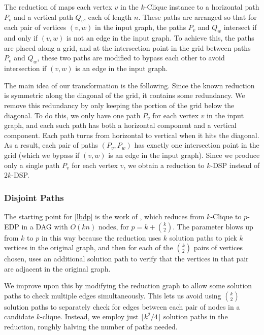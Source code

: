 \documentclass[11pt]{article}
\theoremstyle{definition}
\begin{document}
The reduction of \cite{Geometric-Lens} maps each vertex $v$ in the \textsf{$k$-Clique} instance to a horizontal path $P_v$ and a vertical path $Q_v$, each of length $n$. These paths are arranged so that for each pair of vertices $(v,w)$ in the input graph, the paths $P_v$ and $Q_w$ intersect if and only if $(v,w)$ is not an edge in the input graph. To achieve this, the paths are placed along a grid, and at the intersection point in the grid between paths $P_v$ and $Q_w$, these two paths are modified to bypass each other to avoid intersection if $(v,w)$ is an edge in the input graph.

The main idea of our transformation is the following. Since the known reduction is symmetric along the diagonal of the grid, it contains some redundancy. 
We remove this redundancy by only keeping the portion of the grid below the diagonal. 
To do this, we only have one path $P_v$ for each vertex $v$ in the input graph, and each such path has both a horizontal component and a vertical component. Each path turns from horizontal to vertical when it hits the diagonal. 
As a result, each pair of paths $(P_v, P_w)$ has exactly one intersection point in the grid (which we bypass if $(v,w)$ is an edge in the input graph). 
Since we produce only a single path $P_v$ for each vertex $v$, we obtain a reduction to $k$-\textsf{DSP} instead of $2k$-\textsf{DSP}.


\subsubsection*{Disjoint Paths}

The starting point for \cref{lbdp} is the work of \cite{Slivkins2010}, which reduces from \textsf{$k$-Clique} to \textsf{$p$-EDP} in a DAG with $O(kn)$ nodes, for $p=k + \binom{k}{2}$. 
The parameter blows up from $k$ to $p$ in this way because the reduction uses $k$ solution paths to pick $k$ vertices in the original graph, and then for each of the $\binom{k}{2}$ pairs of vertices chosen, uses an additional solution path to verify that the vertices in that pair are adjacent in the original graph. 

We improve upon this by modifying the reduction graph to allow some solution paths to check multiple edges simultaneously.
This lets us avoid using $\binom{k}{2}$ solution paths to separately check for edges between each pair of nodes in a candidate $k$-clique. 
Instead, we employ just $\lfloor k^2/4\rfloor$ solution paths in the reduction, roughly halving the number of paths needed. 
\end{document}
